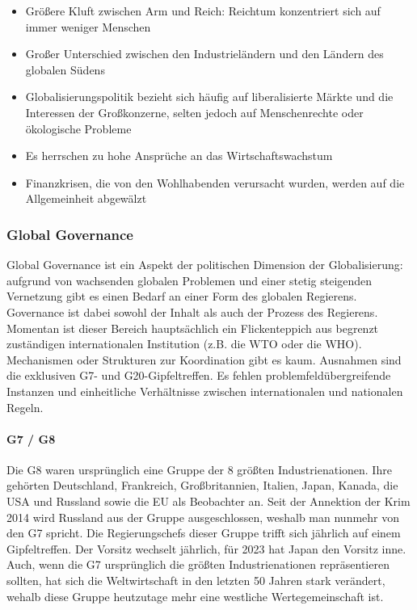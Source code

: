 \documentclass{article}
\begin{document}
	\begin{itemize}
		\item Größere Kluft zwischen Arm und Reich: Reichtum konzentriert sich auf immer weniger Menschen
		\item Großer Unterschied zwischen den Industrieländern und den Ländern des globalen Südens
		\item Globalisierungspolitik bezieht sich häufig auf liberalisierte Märkte und die Interessen der Großkonzerne, selten jedoch auf Menschenrechte oder ökologische Probleme
		\item Es herrschen zu hohe Ansprüche an das Wirtschaftswachstum
		\item Finanzkrisen, die von den Wohlhabenden verursacht wurden, werden auf die Allgemeinheit abgewälzt
	\end{itemize}

	\subsubsection{Global Governance}
	Global Governance ist ein Aspekt der politischen Dimension der Globalisierung: aufgrund von wachsenden globalen Problemen und einer stetig steigenden Vernetzung gibt es einen Bedarf an einer Form des globalen Regierens. Governance ist dabei sowohl der Inhalt als auch der Prozess des Regierens. Momentan ist dieser Bereich hauptsächlich ein Flickenteppich aus begrenzt zuständigen internationalen Institution (z.B. die WTO oder die WHO). Mechanismen oder Strukturen zur Koordination gibt es kaum. Ausnahmen sind die exklusiven G7- und G20-Gipfeltreffen. Es fehlen problemfeldübergreifende Instanzen und einheitliche Verhältnisse zwischen internationalen und nationalen Regeln.

	\paragraph{G7 / G8}
	Die G8 waren ursprünglich eine Gruppe der 8 größten Industrienationen. Ihre gehörten Deutschland, Frankreich, Großbritannien, Italien, Japan, Kanada, die USA und Russland sowie die EU als Beobachter an. Seit der Annektion der Krim 2014 wird Russland aus der Gruppe ausgeschlossen, weshalb man nunmehr von den G7 spricht. Die Regierungschefs dieser Gruppe trifft sich jährlich auf einem Gipfeltreffen. Der Vorsitz wechselt jährlich, für 2023 hat Japan den Vorsitz inne.
	Auch, wenn die G7 ursprünglich die größten Industrienationen repräsentieren sollten, hat sich die Weltwirtschaft in den letzten 50 Jahren stark verändert, wehalb diese Gruppe heutzutage mehr eine westliche Wertegemeinschaft ist.
\end{document}
